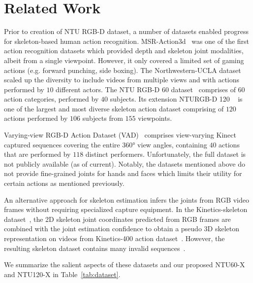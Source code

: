 \documentclass[sigconf,screen,prologue,table,dvipsnames]{acmart}
\begin{document}
\section{Related Work}
\label{sec:related}

Prior to creation of NTU RGB-D dataset, a number of datasets enabled progress for skeleton-based human action recognition. MSR-Action3d~\cite{li2010action} was one of the first action recognition datasets which provided depth and  skeleton joint modalities, albeit from a single viewpoint. However, it only covered a limited set of gaming actions (e.g. forward punching, side boxing). The Northwestern-UCLA dataset~\cite{wang2014crossview} scaled up the diversity to include videos from multiple views and with actions performed by $10$ different actors. The NTU RGB-D 60 dataset~\cite{Shahroudy_2016_CVPR} comprises of $60$ action categories, performed by $40$ subjects. Its extension NTURGB-D 120 ~\cite{Liu_2019_NTURGBD120} is one of the largest and most diverse skeleton action dataset comprising of $120$ actions performed by $106$ subjects from $155$ viewpoints.

 Varying-view RGB-D Action Dataset (VAD)~\cite{ji2019large} comprises view-varying Kinect captured sequences covering the entire \ang{360} view angles, containing $40$ actions that are performed by $118$ distinct performers. Unfortunately, the full dataset is not publicly available (as of current). Notably, the datasets mentioned above do not provide fine-grained joints for hands and faces which limits their utility for certain actions as mentioned previously. 
 
 An alternative approach for skeleton estimation infers the joints from RGB video frames without requiring specialized capture equipment. In the Kinetics-skeleton dataset~\cite{stgcn2018aaai}, the 2D skeleton joint coordinates predicted from RGB frames are combined with the joint estimation confidence to obtain a pseudo 3D skeleton representation on videos from Kinetics-400 action dataset~\cite{Carreira2017QuoVA}. However, the resulting skeleton dataset contains many invalid sequences~\cite{Gupta2021}.  
 
 We summarize the salient aspects of these datasets and our proposed NTU60-X and NTU120-X in Table~\ref{tab:dataset}.  
 
\end{document}
